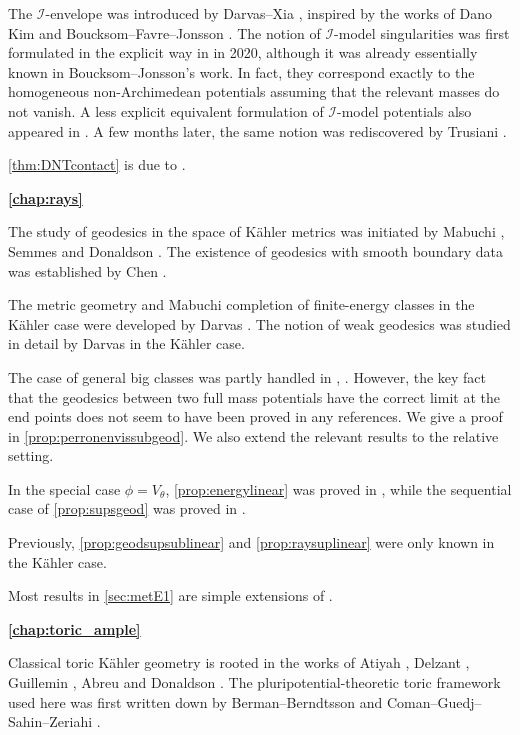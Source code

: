 The $\mathcal{I}$-envelope was introduced by Darvas--Xia \cite{DX22}, inspired by the works of Dano Kim \cite{Kim15} and Boucksom--Favre--Jonsson \cite{BFJ08}. The notion of $\mathcal{I}$-model singularities was first formulated in the explicit way in \cite{DX22} in 2020, although it was already essentially known in Boucksom--Jonsson's work. In fact, they correspond exactly to the homogeneous non-Archimedean potentials assuming that the relevant masses do not vanish. A less explicit equivalent formulation of $\mathcal{I}$-model potentials also appeared in \cite{Dem15}.
A few months later, the same notion was rediscovered by Trusiani \cite{Tru22}.

\cref{thm:DNTcontact} is due to \cite{DNT21}.

\textbf{\cref{chap:rays}}

The study of geodesics in the space of K\"ahler metrics was initiated by Mabuchi \cite{Mab87}, Semmes \cite{Sem92} and Donaldson \cite{Don99}. The existence of geodesics with smooth boundary data was established by Chen \cite{Chen00}.

The metric geometry and Mabuchi completion of finite-energy classes in the K\"ahler case were developed by Darvas \cite{Dar15, Dar17}. The notion of weak geodesics was studied in detail by Darvas \cite{Da17} in the K\"ahler case.

The case of general big classes was partly handled in \cite{DDNL18fullmass}, \cite{DDNL18big}.
However, the key fact that the geodesics between two full mass potentials have the correct limit at the end points does not seem to have been proved in any references. We give a proof in \cref{prop:perronenvissubgeod}. We also extend the relevant results to the relative setting.

In the special case $\phi=V_\theta$, \cref{prop:energylinear} was proved in \cite[Theorem~3.12]{DDNL18fullmass}, while the sequential case of \cref{prop:supsgeod} was proved in \cite[Proposition~3.3]{DDNL18fullmass}.

Previously, \cref{prop:geodsupsublinear} and \cref{prop:raysuplinear} were only known in the K\"ahler case.

Most results in \cref{sec:metE1} are simple extensions of \cite{DDNL18big}.

\textbf{\cref{chap:toric_ample}}

Classical toric K\"ahler geometry is rooted in the works of Atiyah \cite{Ati82}, Delzant \cite{Del88}, Guillemin \cite{Gui94}, Abreu \cite{Abr98} and Donaldson \cite{Don02}. The pluripotential-theoretic toric framework used here was first written down by Berman--Berndtsson \cite{BB13} and Coman--Guedj--Sahin--Zeriahi \cite{CGSZ19}.

